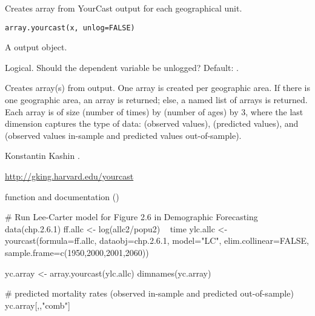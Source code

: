 %
\begin{Description}\relax
Creates array from YourCast output for each
geographical unit.
\end{Description}
%
\begin{Usage}
\begin{verbatim}
array.yourcast(x, unlog=FALSE)
\end{verbatim}
\end{Usage}
%
\begin{Arguments}
\begin{ldescription}

\item[\code{x}] A  output object.

\item[\code{unlog}] Logical. Should the dependent variable be unlogged? Default: .
\end{ldescription}
\end{Arguments}
%
\begin{Value}
Creates array(s) from  output. One array is created per geographic area. If there is one geographic area, an array is returned; else, a named list of arrays is returned. Each array is of size  (number of times) by  (number of ages) by 3, where the last dimension captures the type of data:  (observed values),  (predicted values), and  (observed values in-sample and predicted values out-of-sample).
\end{Value}
%
\begin{Author}\relax
Konstantin Kashin .
\end{Author}
%
\begin{References}\relax
\url{http://gking.harvard.edu/yourcast}
\end{References}
%
\begin{SeeAlso}\relax
{} function and documentation
()
\end{SeeAlso}
%
\begin{Examples}
\begin{ExampleCode}
# Run Lee-Carter model for Figure 2.6 in Demographic Forecasting
data(chp.2.6.1)
ff.allc <- log(allc2/popu2) ~  time	
ylc.allc <- yourcast(formula=ff.allc, dataobj=chp.2.6.1, model="LC",
                       elim.collinear=FALSE,
                       sample.frame=c(1950,2000,2001,2060))
                       
yc.array <- array.yourcast(ylc.allc)
dimnames(yc.array)

# predicted mortality rates (observed in-sample and predicted out-of-sample)
yc.array[,,"comb"]
\end{ExampleCode}
\end{Examples}
